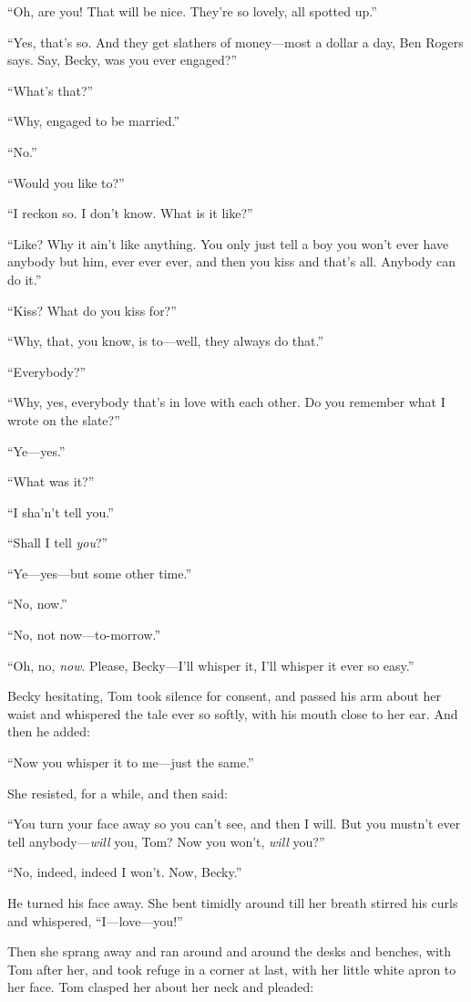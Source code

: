 \documentclass{book}
\begin{document}
“Oh, are you! That will be nice. They’re so lovely, all spotted up.”

“Yes, that’s so. And they get slathers of money—most a dollar a day, Ben Rogers says. Say, Becky, was you ever engaged?”

“What’s that?”

“Why, engaged to be married.”

“No.”

“Would you like to?”

“I reckon so. I don’t know. What is it like?”

“Like? Why it ain’t like anything. You only just tell a boy you won’t ever have anybody but him, ever ever ever, and then you kiss and that’s all. Anybody can do it.”

“Kiss? What do you kiss for?”

“Why, that, you know, is to—well, they always do that.”

“Everybody?”

“Why, yes, everybody that’s in love with each other. Do you remember what I wrote on the slate?”

“Ye—yes.”

“What was it?”

“I sha’n’t tell you.”

“Shall I tell \emph{you}?”

“Ye—yes—but some other time.”

“No, now.”

“No, not now—to-morrow.”

“Oh, no, \emph{now}. Please, Becky—I’ll whisper it, I’ll whisper it ever so easy.”

Becky hesitating, Tom took silence for consent, and passed his arm about her waist and whispered the tale ever so softly, with his mouth close to her ear. And then he added:

“Now you whisper it to me—just the same.”

She resisted, for a while, and then said:

“You turn your face away so you can’t see, and then I will. But you mustn’t ever tell anybody—\emph{will} you, Tom? Now you won’t, \emph{will} you?”

“No, indeed, indeed I won’t. Now, Becky.”

He turned his face away. She bent timidly around till her breath stirred his curls and whispered, “I—love—you!”

Then she sprang away and ran around and around the desks and benches, with Tom after her, and took refuge in a corner at last, with her little white apron to her face. Tom clasped her about her neck and pleaded:
\end{document}

